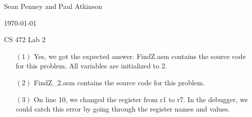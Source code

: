 \documentclass[letterpaper,10pt,titlepage]{article}
\def\name{Sean Penney and Paul Atkinson}
\begin{document}
\hfill \name

\hfill \today

\hfill CS 472 Lab 2

\begin{enumerate}

\section*{Part 1: Problem Set 5}
\item[$(1)$] Yes, we got the expected answer.  FindZ.asm contains the source code for this problem.  All variables are initialized to 2.

\item[$(2)$] FindZ\_2.asm contains the source code for this problem.

\item[$(3)$] On line 10, we changed the register from r1 to r7.  In the debugger, we could catch this error by going through the register names and values.


  
\end{enumerate}
\end{document}
